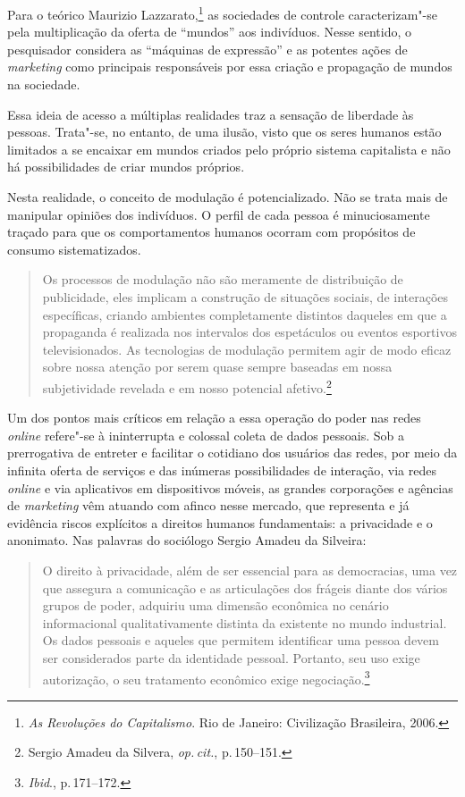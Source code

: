 Para o teórico Maurizio Lazzarato,\footnote{\textit{As Revoluções do Capitalismo}. Rio de
Janeiro: Civilização Brasileira, 2006.} as sociedades de controle
caracterizam"-se pela multiplicação da oferta de ``mundos'' aos
indivíduos. Nesse sentido, o pesquisador considera as ``máquinas de
expressão'' e as potentes ações de \textit{marketing} como principais
responsáveis por essa criação e propagação de mundos na sociedade.

Essa ideia de acesso a múltiplas realidades traz a sensação de liberdade
às pessoas. Trata"-se, no entanto, de uma ilusão, visto que os seres
humanos estão limitados a se encaixar em mundos criados pelo próprio
sistema capitalista e não há possibilidades de criar mundos próprios.

Nesta realidade, o conceito de modulação é potencializado. Não se trata
mais de manipular opiniões dos indivíduos. O perfil de cada pessoa é
minuciosamente traçado para que os comportamentos humanos ocorram com
propósitos de consumo sistematizados.

\begin{quote}
Os processos de modulação não são meramente de distribuição de
publicidade, eles implicam a construção de situações sociais, de
interações específicas, criando ambientes completamente distintos
daqueles em que a propaganda é realizada nos intervalos dos espetáculos
ou eventos esportivos televisionados. As tecnologias de modulação
permitem agir de modo eficaz sobre nossa atenção por serem quase sempre
baseadas em nossa subjetividade revelada e em nosso potencial afetivo.\footnote{Sergio Amadeu da Silvera, \textit{op.\,cit.}, p.\,150--151.}
\end{quote}

Um dos pontos mais críticos em relação a essa operação do poder nas
redes \textit{online} refere"-se à ininterrupta e colossal coleta de dados
pessoais. Sob a prerrogativa de entreter e facilitar o cotidiano dos
usuários das redes, por meio da infinita oferta de serviços e das
inúmeras possibilidades de interação, via redes \textit{online} e via aplicativos
em dispositivos móveis, as grandes corporações e agências de \textit{marketing}
vêm atuando com afinco nesse mercado, que representa e já evidência
riscos explícitos a direitos humanos fundamentais: a privacidade e o
anonimato. Nas palavras do sociólogo Sergio Amadeu da Silveira:

\begin{quote}
O direito à privacidade, além de ser essencial para as democracias, uma
vez que assegura a comunicação e as articulações dos frágeis diante dos
vários grupos de poder, adquiriu uma dimensão econômica no cenário
informacional qualitativamente distinta da existente no mundo
industrial. Os dados pessoais e aqueles que permitem identificar uma
pessoa devem ser considerados parte da identidade pessoal. Portanto, seu
uso exige autorização, o seu tratamento econômico exige negociação.\footnote{\textit{Ibid}., p.\,171--172.}
\end{quote}

